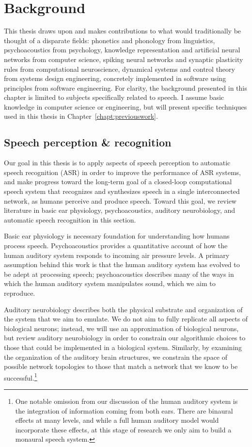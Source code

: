 \chapter{Background}
\label{chapt:bg}

This thesis draws upon and makes contributions
to what would traditionally be thought of a disparate fields:
phonetics and phonology from linguistics,
psychoacoustics from psychology,
knowledge representation
and artificial neural networks from computer science,
spiking neural networks and
synaptic plasticity rules from computational neuroscience,
dynamical systems and control theory
from systems design engineering,
concretely implemented in software
using principles from software engineering.
For clarity, the background presented
in this chapter is limited
to subjects specifically related to speech.
I assume basic knowledge in
computer science or engineering,
but will present specific techniques
used in this thesis
in Chapter~\ref{chapt:previouswork}.

\section{Speech perception \& recognition}

Our goal in this thesis is to
apply aspects of speech perception
to automatic speech recognition (ASR)
in order to
improve the performance of ASR systems,
and make progress toward
the long-term goal of a closed-loop
computational speech system
that recognizes and synthesizes speech
in a single interconnected network,
as humans perceive and produce speech.
Toward this goal,
we review literature in
basic ear physiology,
psychoacoustics,
auditory neurobiology,
and automatic speech recognition
in this section.

Basic ear physiology is necessary
foundation for understanding
how humans process speech.
Psychoacoustics provides a quantitative account
of how the human auditory system
responds to incoming air pressure levels.
A primary assumption behind this work
is that the human auditory system
has evolved to be adept at processing speech;
psychoacoustics describes many of the ways
in which the human auditory system
manipulates sound,
which we aim to reproduce.

Auditory neurobiology describes both
the physical substrate and organization
of the system that we aim to emulate.
We do not aim to fully replicate
all aspects of biological neurons;
instead, we will use an approximation
of biological neurons,
but review auditory neurobiology
in order to constrain our algorithmic choices
to those that could be implemented
in a biological system.
Similarly, by examining the organization
of the auditory brain structures,
we constrain the space of possible
network topologies
to those that match
a network that we know
to be successful.\footnote{One notable omission
  from our discussion
  of the human auditory system
  is the integration of information
  coming from both ears.
  There are binaural effects at many levels,
  and while a full human auditory model
  would incorporate these effects,
  at this stage of research
  we only aim to build
  a monaural speech system.}


